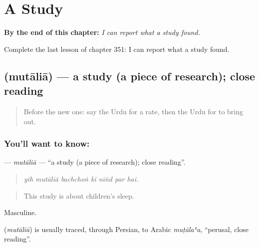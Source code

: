 
\chapter{A Study}
\label{ch:ur-a-study}

\begin{chapteropening}
\textbf{By the end of this chapter:} \emph{I can report what a study found.}

Complete the last lesson of chapter 351: I can report what a study found.
\end{chapteropening}

\section[\texorpdfstring{\ur{مطالعہ} (mutāliā)}{مطالعہ (mutāliā)}]{ (mutāliā) — a study (a piece of research); close reading}

\label{lesson:UR-C351-mutalia}



\begin{quote}
Before the new one: say the Urdu for a rate, then the Urdu for to bring out.
\end{quote}

\subsection*{You'll want to know: }
\textbf{} — \emph{mutāliā} — \textquotedblleft{}a study (a piece of research); close reading\textquotedblright{}.

\begin{quote}
      
\end{quote}

\begin{quote}
\emph{yih mutāliā bachchoṅ kī nīṅd par hai.}
\end{quote}

\begin{quote}
This study is about children's sleep.
\end{quote}

Masculine.

\begin{cousinweb}
\textbf{} (\emph{mutāliā}) is usually traced, through Persian, to Arabic \emph{muṭālaʿa}, \textquotedblleft{}perusal, close reading\textquotedblright{}.
\end{cousinweb}

